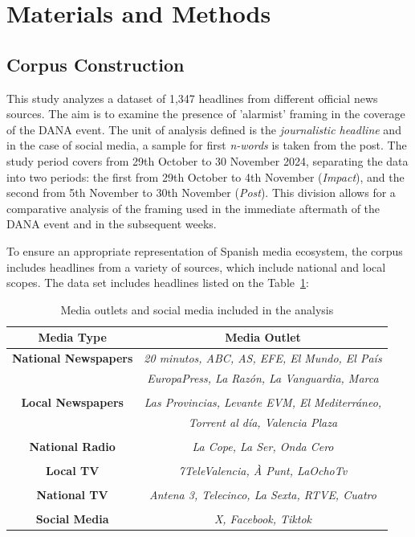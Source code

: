 \section{Materials and Methods} \label{sec:materials}

\subsection{Corpus Construction}
This study analyzes a dataset of 1,347 headlines from different official news sources. The aim is to examine the presence of 'alarmist' 
framing in the coverage of the DANA event. The unit of analysis defined is the \textit{journalistic headline} and in the case of social media,
a sample for first \textit{n-words} is taken from the post. The study period covers from 29th October to 30 November 2024, separating the data into
two periods: the first from 29th October to 4th November (\textit{Impact}), and the second from 5th November to 30th November (\textit{Post}). 
This division allows for a comparative analysis of the framing used in the immediate aftermath of the DANA event and in the subsequent weeks.

To ensure an appropriate representation of Spanish media ecosystem, the corpus includes headlines from a variety of sources,
which include national and local scopes. The data set includes headlines listed on the Table~\ref{tab:medios}:
\begin{table}
\centering
\begin{tabular}{c c}
    \toprule
    \textbf{Media Type} & \textbf{Media Outlet} \\
    \hline
    \textbf{National Newspapers} & \textit{20 minutos, ABC, AS, EFE, El Mundo, El País} \\
                        & \textit{EuropaPress, La Razón, La Vanguardia, Marca} \\
    \midrule \\
    \textbf{Local Newspapers} & \textit{Las Provincias, Levante EVM, El Mediterráneo,} \\ 
    & \textit{Torrent al día, Valencia Plaza} \\
    \midrule \\
    \textbf{National Radio} & \textit{La Cope, La Ser, Onda Cero} \\
    \midrule \\
    \textbf{Local TV} & \textit{7TeleValencia, À Punt, LaOchoTv} \\
    \midrule \\
    \textbf{National TV} & \textit{Antena 3, Telecinco, La Sexta, RTVE, Cuatro} \\
    \midrule \\
    \textbf{Social Media} & \textit{X, Facebook, Tiktok } \\
    \hline
\end{tabular}
\caption{Media outlets and social media included in the analysis}
    \label{tab:medios}
\end{table} 

